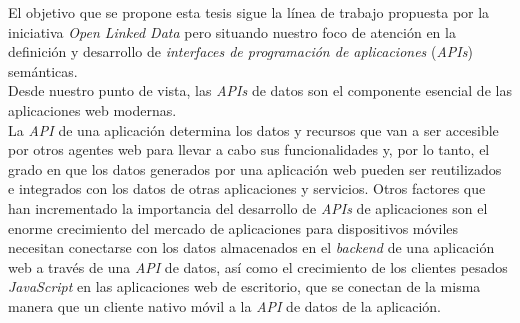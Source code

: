 El objetivo que se propone esta tesis sigue la l\'inea de trabajo propuesta por la iniciativa {\it Open Linked Data} pero situando nuestro foco de atenci\'on en la definici\'on y desarrollo de {\it interfaces de programaci\'on de aplicaciones} ({\it APIs}) sem\'anticas.\\
Desde nuestro punto de vista, las {\it APIs} de datos son el componente esencial de las aplicaciones web modernas.\\
La {\it API} de una aplicaci\'on determina los datos y recursos que van a ser accesible por otros agentes web para llevar a cabo sus funcionalidades y, por lo tanto, el grado en que los datos generados por una aplicaci\'on web pueden ser reutilizados e integrados con los datos de otras aplicaciones y servicios. Otros factores que han incrementado la importancia del desarrollo de {\it APIs} de aplicaciones son el enorme crecimiento del mercado de aplicaciones para dispositivos m\'oviles necesitan conectarse con los datos almacenados en el {\it backend} de una aplicaci\'on web a trav\'es de una {\it API} de datos, as\'i como el crecimiento de los clientes pesados {\it JavaScript} en las aplicaciones web de escritorio, que se conectan de la misma manera que un cliente nativo m\'ovil a la {\it API} de datos de la aplicaci\'on.